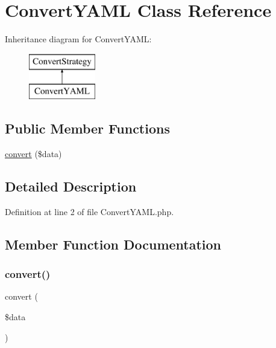 \hypertarget{class_convert_y_a_m_l}{}\section{Convert\+Y\+A\+ML Class Reference}
\label{class_convert_y_a_m_l}
Inheritance diagram for Convert\+Y\+A\+ML\+:\begin{figure}[H]
\begin{center}
\leavevmode
\includegraphics[height=2.000000cm]{class_convert_y_a_m_l}
\end{center}
\end{figure}
\subsection*{Public Member Functions}
\begin{DoxyCompactItemize}
\item 
\hyperlink{class_convert_y_a_m_l_a41444ea294bbd35a6c07ef4e9faeae10}{convert} (\$data)
\end{DoxyCompactItemize}


\subsection{Detailed Description}


Definition at line 2 of file Convert\+Y\+A\+M\+L.\+php.



\subsection{Member Function Documentation}
\hypertarget{class_convert_y_a_m_l_a41444ea294bbd35a6c07ef4e9faeae10}{}\label{class_convert_y_a_m_l_a41444ea294bbd35a6c07ef4e9faeae10} 
\subsubsection{\texorpdfstring{convert()}{convert()}}
{\footnotesize\ttfamily convert (\begin{DoxyParamCaption}\item[{}]{\$data }\end{DoxyParamCaption})}

